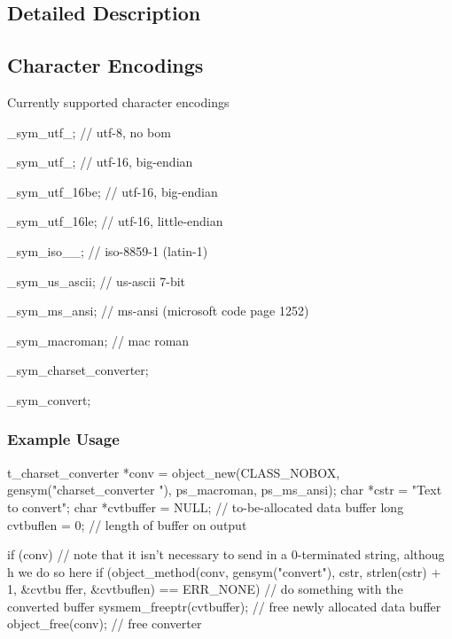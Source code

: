\subsection{Detailed Description}
\hypertarget{group__unicode_unicode_character_encodings}{}\subsection{Character Encodings}\label{group__unicode_unicode_character_encodings}
Currently supported character encodings
\begin{DoxyItemize}
\item \_\-sym\_\-utf\_; // utf-\/8, no bom
\item \_\-sym\_\-utf\_; // utf-\/16, big-\/endian
\item \_\-sym\_\-utf\_\-16be; // utf-\/16, big-\/endian
\item \_\-sym\_\-utf\_\-16le; // utf-\/16, little-\/endian
\item \_\-sym\_\-iso\_\_; // iso-\/8859-\/1 (latin-\/1)
\item \_\-sym\_\-us\_\-ascii; // us-\/ascii 7-\/bit
\item \_\-sym\_\-ms\_\-ansi; // ms-\/ansi (microsoft code page 1252)
\item \_\-sym\_\-macroman; // mac roman
\item 
\item \_\-sym\_\-charset\_\-converter;
\item \_\-sym\_\-convert;
\end{DoxyItemize}\hypertarget{group__unicode_unicode_character_encodings_example}{}\subsubsection{Example Usage}\label{group__unicode_unicode_character_encodings_example}

\begin{DoxyCode}
    t_charset_converter *conv = object_new(CLASS_NOBOX, gensym("charset_converter
      "), ps_macroman, ps_ms_ansi);
    char *cstr = "Text to convert";
    char *cvtbuffer = NULL; // to-be-allocated data buffer
    long cvtbuflen = 0; // length of buffer on output

    if (conv) {
        // note that it isn't necessary to send in a 0-terminated string, althoug
      h we do so here
        if (object_method(conv, gensym("convert"), cstr, strlen(cstr) + 1, &cvtbu
      ffer, &cvtbuflen) == ERR_NONE) {
            // do something with the converted buffer
            sysmem_freeptr(cvtbuffer); // free newly allocated data buffer
        }
        object_free(conv); // free converter
    }
\end{DoxyCode}
 

